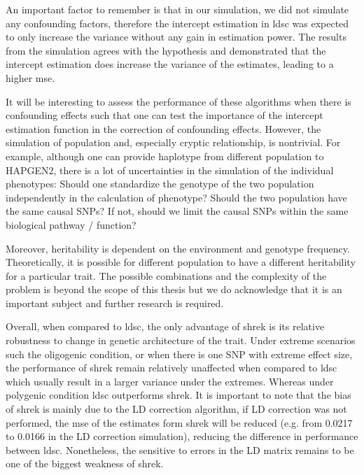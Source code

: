 	An important factor to remember is that in our simulation, we did not simulate any confounding factors, therefore the intercept estimation in \gls{ldsc} was expected to only increase the variance without any gain in estimation power. 
	The results from the simulation agrees with the hypothesis and demonstrated that the intercept estimation does increase the variance of the estimates, leading to a higher \gls{mse}. 
	
	It will be interesting to assess the performance of these algorithms when there is confounding effects such that one can test the importance of the intercept estimation function in the correction of confounding effects.
	However, the simulation of population and, especially cryptic relationship, is nontrivial.
	For example, although one can provide haplotype from different population to HAPGEN2, there is a lot of uncertainties in the simulation of the individual phenotypes: 
	Should one standardize the genotype of the two population independently in the calculation of phenotype? 
	Should the two population have the same causal \glspl{SNP}?
	If not, should we limit the causal \glspl{SNP} within the same biological pathway / function?
	
	Moreover, heritability is dependent on the environment and genotype frequency. 
	Theoretically, it is possible for different population to have a different heritability for a particular trait.
	The possible combinations and the complexity of the problem is beyond the scope of this thesis but we do acknowledge that it is an important subject and further research is required.
	
	Overall, when compared to \gls{ldsc}, the only advantage of \gls{shrek} is its relative robustness to change in genetic architecture of the trait.
	Under extreme scenarios such the oligogenic condition, or when there is one \gls{SNP} with extreme effect size, the performance of \gls{shrek} remain relatively unaffected when compared to \gls{ldsc} which usually result in a larger variance under the extremes. 
	Whereas under polygenic condition \gls{ldsc} outperforms \gls{shrek}.
	It is important to note that the bias of \gls{shrek} is mainly due to the \gls{LD} correction algorithm, if \gls{LD} correction was not performed, the \gls{mse} of the estimates form \gls{shrek} will be reduced (e.g. from 0.0217 to 0.0166 in the \gls{LD} correction simulation), reducing the difference in performance between \gls{ldsc}.
	Nonetheless, the sensitive to errors in the \gls{LD} matrix remains to be one of the biggest weakness of \gls{shrek}.
	

